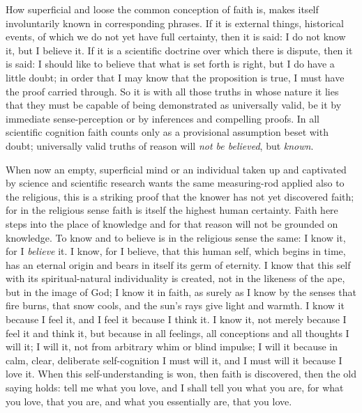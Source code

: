 \documentclass[12pt,a4paper,openany]{book}
\newcommand{\opage}[1]{\marginnote{\footnotesize\textit{[#1]}}}
\begin{document}
How superficial and loose the common conception of faith is, makes itself involuntarily known in corresponding phrases. If
it is external things, historical events, of which we do not yet have full certainty, then it is said: I do not know it, but
I believe it. If it is a scientific doctrine over which there is dispute, then it is said: I should like to believe that what
is set forth is right, but I do have a little doubt; in order that I may know that the proposition is true, I must have the
proof carried through. So it is with all those truths in whose nature it lies that they must be capable of being
demonstrated as universally valid, be it by immediate sense-perception or by inferences and compelling proofs. In all
scientific cognition faith counts
\setcounter{footnote}{0}%
\opage{42}only as a provisional assumption beset with doubt; universally valid truths of reason will \emph{not be believed}, but
\emph{known}.

When now an empty, superficial mind or an individual taken up and captivated by science and scientific research wants the
same measuring-rod applied also to the religious, this is a striking proof that the knower has not yet discovered faith; for
in the religious sense faith is itself the highest human certainty. Faith here steps into the place of knowledge and for that
reason will not be grounded on knowledge. To know and to believe is in the religious sense the same: I know it, for I
\emph{believe} it. I know, for I believe, that this human self, which begins in time, has an eternal origin and bears in
itself its germ of eternity. I know that this self with its spiritual-natural individuality is created, not in the likeness
of the ape, but in the image of God; I know it in faith, as surely as I know by the senses that fire burns, that snow cools,
and the sun's rays give light and warmth. I know it because I feel it, and I feel it because I think it. I know it, not
merely because I feel it and think it, but because in all feelings, all conceptions and all thoughts I will it; I will it,
not from arbitrary whim or blind impulse; I will it because in calm, clear, deliberate self-cognition I must will it, and I
must will it because I love it. When this self-understanding is won, then faith is discovered, then the old saying holds: tell
me what you love, and I shall tell you what you are, for what you love, that you are, and what you essentially are, that
you love.
\end{document}
